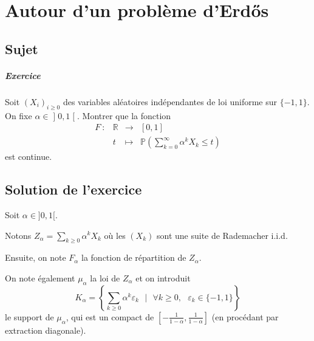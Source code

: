 \chapter{Autour d'un problème d'Erd{\H{o}}s}

\section{Sujet}

\paragraph{Exercice}
Soit $(X_i)_{i\geqslant 0}$ des variables aléatoires indépendantes de loi uniforme sur $\{-1,1\}$. On fixe $\alpha \in \mathopen]0,1\mathclose[$.
Montrer que la fonction
\[
\begin{array}{cccc}
F \ :  &\mathbb R & \longrightarrow & [0,1]\\
& t & \longmapsto & \displaystyle\mathbb P\left(\sum_{k=0}^\infty \alpha^k X_k \leqslant t\right)
\end{array}
\]
est continue.


\section{Solution de l'exercice}

Soit $\alpha\in]0,1[.$

Notons $\displaystyle Z_{\alpha}=\sum_{k\geq 0}\alpha^{k}X_{k}$ où les $(X_{k})$ sont une suite de Rademacher i.i.d.

Ensuite, on note $\displaystyle F_{\alpha}$ la fonction de répartition de $Z_{\alpha}.$

On note également $\mu_{\alpha}$ la loi de $Z_{\alpha}$ et on introduit $$K_{\alpha}=\left\{ \sum_{k\geq 0}\alpha^{k}\varepsilon_{k}\mbox{ }|\mbox{ } \forall k\geq 0,\mbox{ } \varepsilon_{k}\in\{-1,1\}  \right\}$$ le support de $\mu_{\alpha}$, qui est un compact de $\displaystyle [-\frac{1}{1-\alpha},\frac{1}{1-\alpha}]$ (en procédant par extraction diagonale).

